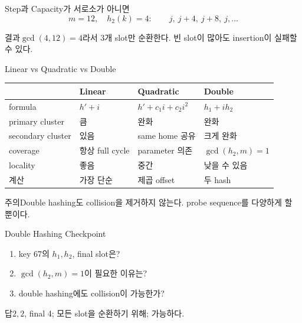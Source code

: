 \begin{frame}{Step과 Capacity가 서로소가 아니면}
\[
m=12,\quad h_2(k)=4:\qquad j,\ j+4,\ j+8,\ j,\ldots
\]
\centering{}
\begin{alertblock}{결과}$\gcd(4,12)=4$라서 3개 slot만 순환한다. 빈 slot이 많아도 insertion이 실패할 수 있다.\end{alertblock}
\end{frame}
\begin{frame}{Linear vs Quadratic vs Double}
\scriptsize\centering\begin{tabular}{llll}\toprule
&Linear&Quadratic&Double\\\midrule
formula&$h'+i$&$h'+c_1i+c_2i^2$&$h_1+ih_2$\\
primary cluster&큼&완화&완화\\
secondary cluster&있음&same home 공유&크게 완화\\
coverage&항상 full cycle&parameter 의존&$\gcd(h_2,m)=1$\\
locality&좋음&중간&낮을 수 있음\\
계산&가장 단순&제곱 offset&두 hash\\\bottomrule
\end{tabular}
\begin{alertblock}{주의}Double hashing도 collision을 제거하지 않는다. probe sequence를 다양하게 할 뿐이다.\end{alertblock}
\end{frame}
\begin{frame}{Double Hashing Checkpoint}
\begin{enumerate}\item key 67의 $h_1,h_2$, final slot은?\item $\gcd(h_2,m)=1$이 필요한 이유는?\item double hashing에도 collision이 가능한가?\end{enumerate}
\begin{exampleblock}{답}$2,2$, final 4; 모든 slot을 순환하기 위해; 가능하다.\end{exampleblock}
\end{frame}
